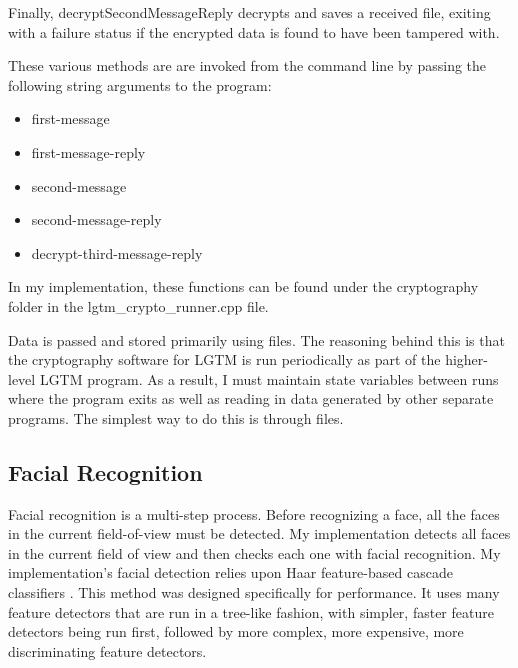 \documentclass[12pt]{report}
\begin{document}
Finally, decryptSecondMessageReply decrypts and saves a received file, exiting with a failure status if the encrypted data is found to have been tampered with. \par

These various methods are are invoked from the command line by passing the following string arguments to the program: 

\begin{itemize}
    \item first-message
    \item first-message-reply
    \item second-message
    \item second-message-reply
    \item decrypt-third-message-reply
\end{itemize}

In my implementation, these functions can be found under the cryptography folder in the lgtm\_crypto\_runner.cpp file. \par

Data is passed and stored primarily using files. The reasoning behind this is that the cryptography software for LGTM is run periodically as part of the higher-level LGTM program. As a result, I must maintain state variables between runs where the program exits as well as reading in data generated by other separate programs. The simplest way to do this is through files. \par

\subsection{Facial Recognition}
Facial recognition is a multi-step process. Before recognizing a face, all the faces in the current field-of-view must be detected. My implementation detects all faces in the current field of view and then checks each one with facial recognition. My implementation's facial detection relies upon Haar feature-based cascade classifiers \cite{HaarCascadeViola2001}. This method was designed specifically for performance. It uses many feature detectors that are run in a tree-like fashion, with simpler, faster feature detectors being run first, followed by more complex, more expensive, more discriminating feature detectors. \par
\end{document}
